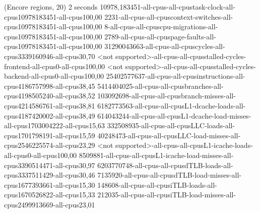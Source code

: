 (Encore regions, 20)
2 seconds
10978,183451-all-cpus-all-cpustask-clock-all-cpus10978183451-all-cpus100,00
2231-all-cpus-all-cpuscontext-switches-all-cpus10978183451-all-cpus100,00
8-all-cpus-all-cpuscpu-migrations-all-cpus10978183451-all-cpus100,00
2789-all-cpus-all-cpuspage-faults-all-cpus10978183451-all-cpus100,00
31290043663-all-cpus-all-cpuscycles-all-cpus3339160946-all-cpus30,70
<not supported>-all-cpus-all-cpusstalled-cycles-frontend-all-cpus0-all-cpus100,00
<not supported>-all-cpus-all-cpusstalled-cycles-backend-all-cpus0-all-cpus100,00
25402577637-all-cpus-all-cpusinstructions-all-cpus4186757998-all-cpus38,45
5414404025-all-cpus-all-cpusbranches-all-cpus4198505240-all-cpus38,52
103092698-all-cpus-all-cpusbranch-misses-all-cpus4214586761-all-cpus38,81
6182773563-all-cpus-all-cpusL1-dcache-loads-all-cpus4187420002-all-cpus38,49
614043244-all-cpus-all-cpusL1-dcache-load-misses-all-cpus1703004222-all-cpus15,63
332508935-all-cpus-all-cpusLLC-loads-all-cpus1701798191-all-cpus15,59
40248473-all-cpus-all-cpusLLC-load-misses-all-cpus2546225574-all-cpus23,29
<not supported>-all-cpus-all-cpusL1-icache-loads-all-cpus0-all-cpus100,00
8509881-all-cpus-all-cpusL1-icache-load-misses-all-cpus3390514471-all-cpus30,97
6203770748-all-cpus-all-cpusdTLB-loads-all-cpus3337511429-all-cpus30,46
7135920-all-cpus-all-cpusdTLB-load-misses-all-cpus1677393661-all-cpus15,30
148608-all-cpus-all-cpusiTLB-loads-all-cpus1670526822-all-cpus15,33
212035-all-cpus-all-cpusiTLB-load-misses-all-cpus2499913669-all-cpus23,01
